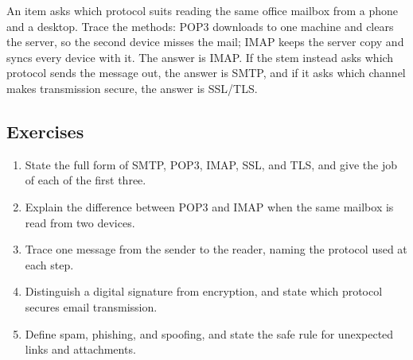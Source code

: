 \begin{example}
An item asks which protocol suits reading the same office mailbox from a
phone and a desktop. Trace the methods: POP3 downloads to one machine and
clears the server, so the second device misses the mail; IMAP keeps the
server copy and syncs every device with it. The answer is IMAP. If the stem
instead asks which protocol sends the message out, the answer is SMTP, and
if it asks which channel makes transmission secure, the answer is SSL/TLS.
\end{example}

\subsection*{Exercises}
\begin{enumerate}[label=\arabic*.]
  \item State the full form of SMTP, POP3, IMAP, SSL, and TLS, and give the
    job of each of the first three.
  \item Explain the difference between POP3 and IMAP when the same mailbox
    is read from two devices.
  \item Trace one message from the sender to the reader, naming the
    protocol used at each step.
  \item Distinguish a digital signature from encryption, and state which
    protocol secures email transmission.
  \item Define spam, phishing, and spoofing, and state the safe rule for
    unexpected links and attachments.
\end{enumerate}

